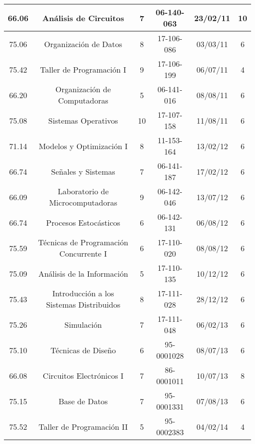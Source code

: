 {\begin{center}
\begin{tabular}{|c|c|c|c|c|c|}
            \hline
            66.06 & Análisis de Circuitos                      & 7  & 06-140-063 & 23/02/11 & 10 \\
            \hline
            75.06 & Organización de Datos                      & 8  & 17-106-086 & 03/03/11 & 6 \\
            \hline
            75.42 & Taller de Programación I                   & 9  & 17-106-199 & 06/07/11 & 4 \\
            \hline
            66.20 & Organización de Computadoras               & 5  & 06-141-016 & 08/08/11 & 6 \\
            \hline
            75.08 & Sistemas Operativos                        & 10 & 17-107-158 & 11/08/11 & 6 \\
            \hline 
            71.14 & Modelos y Optimización I                   & 8  & 11-153-164 & 13/02/12 & 6 \\
            \hline
            66.74 & Señales y Sistemas                         & 7  & 06-141-187 & 17/02/12 & 6 \\
            \hline
            66.09 & Laboratorio de Microcomputadoras           & 9  & 06-142-046 & 13/07/12 & 6 \\
            \hline
            66.74 & Procesos Estocásticos                      & 6  & 06-142-131 & 06/08/12 & 6 \\
            \hline
            75.59 & Técnicas de Programación Concurrente I     & 6  & 17-110-020 & 08/08/12 & 6 \\
            \hline
            75.09 & Análisis de la Información                 & 5  & 17-110-135 & 10/12/12 & 6 \\
            \hline
            75.43 & Introducción a los Sistemas Distribuidos   & 8  & 17-111-028 & 28/12/12 & 6 \\
            \hline
            75.26 & Simulación                                 & 7  & 17-111-048 & 06/02/13 & 6 \\
            \hline
            75.10 & Técnicas de Diseño                         & 6  & 95-0001028 & 08/07/13 & 6 \\
            \hline
            66.08 & Circuitos Electrónicos I                   & 7  & 86-0001011 & 10/07/13 & 8 \\
            \hline
            75.15 & Base de Datos                              & 7  & 95-0001331 & 07/08/13 & 6 \\
            \hline
            75.52 & Taller de Programación II                  & 5  & 95-0002383 & 04/02/14 & 4 \\

\end{tabular}
\end{center}}
